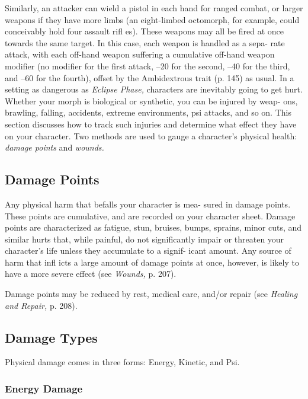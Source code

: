 Similarly, an attacker can wield a pistol in each hand 
for ranged combat, or larger weapons if they have 
more limbs (an eight-limbed octomorph, for example, 
could conceivably hold four assault rifl es).  These 
weapons may all be fired at once towards the same 
target. In this case, each weapon is handled as a sepa-
rate attack, with each off-hand weapon suffering a 
cumulative off-hand weapon modifier (no modifier for 
the first attack, –20 for the second, –40 for the third, 
and –60 for the fourth), offset by the Ambidextrous 
trait (p. 145) as usual.
In a setting as dangerous as \textit{Eclipse Phase,} characters 
are inevitably going to get hurt. Whether your morph 
is biological or synthetic, you can be injured by weap-
ons, brawling, falling, accidents, extreme environments, 
psi attacks, and so on. This section discusses how to 
track such injuries and determine what effect they have 
on your character. Two methods are used to gauge a 
character's physical health: \textit{damage points} and \textit{wounds.}

\subsection{Damage Points}

Any physical harm that befalls your character is mea-
sured in damage points. These points are cumulative, 
and are recorded on your character sheet. Damage 
points are characterized as fatigue, stun, bruises, 
bumps, sprains, minor cuts, and similar hurts that, 
while painful, do not significantly impair or threaten 
your character's life unless they accumulate to a signif-
icant amount. Any source of harm that infl icts a large 
amount of damage points at once, however, is likely to 
have a more severe effect (see \textit{Wounds,} p. 207).

Damage points may be reduced by rest, medical 
care, and/or repair (see \textit{Healing and Repair,} p. 208).

\subsection{Damage Types}

Physical damage comes in three forms: Energy, Kinetic, 
and Psi.

\subsubsection{Energy Damage}

